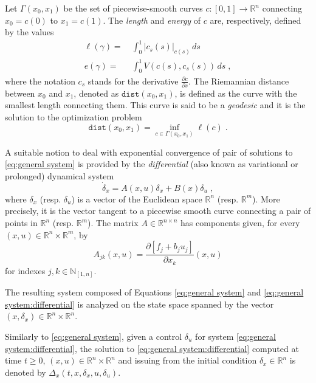 \documentclass[10pt,twocolumn,twoside]{IEEEtran}
\theoremstyle{plain}
\theoremstyle{definition}
\theoremstyle{remark}
\begin{document}
Let $\Gamma(x_0,x_1)$ be the set of piecewise-smooth curves $c:[0,1]\to\mathbb{R}^n$ connecting $x_0=c(0)$ to $x_1=c(1)$. The \emph{length} and \emph{energy} of $c$ are, respectively, defined by the values
\begin{align*}
	\ell(\gamma)=&\ \int_0^1\left|c_s(s)\right|_{c(s)}\,ds\\
	e(\gamma)=&\ \int_0^1V\left(c(s),c_s(s)\right)\,ds\;,
\end{align*}
where the notation $c_s$ stands for the derivative $\tfrac{\partial c}{\partial s}$. The Riemannian distance between $x_0$ and $x_1$, denoted as $\mathbin{\mathtt{dist}}(x_0,x_1)$, is defined as the curve with the smallest length connecting them. This curve is said to be a \emph{geodesic} and it is the solution to the optimization problem
\begin{equation}\label{eq:geodesic formulation}
	\mathbin{\mathtt{dist}}(x_0,x_1)=\inf_{c\in\Gamma(x_0,x_1)}\ell(c)\;.
\end{equation}

A suitable notion to deal with exponential convergence of pair of solutions to \eqref{eq:general system} is provided by the \emph{differential} (also known as variational or prolonged) dynamical system
\begin{equation}\label{eq:general system:differential}
	\dot{\delta}_x=A(x,u)\delta_x+B(x)\delta_u\;,
\end{equation}
where $\delta_x$ (resp. $\delta_u$) is a vector of the Euclidean space $\mathbb{R}^n$ (resp. $\mathbb{R}^m$). More precisely, it is the vector tangent to a piecewise smooth curve connecting a pair of points in $\mathbb{R}^n$ (resp. $\mathbb{R}^m$). The matrix $A\in\mathbb{R}^{n\times n}$ has components given, for every $(x,u)\in\mathbb{R}^n\times\mathbb{R}^m$, by 
\begin{equation*}
	A_{jk}(x,u)=\dfrac{\partial[f_j+b_ju_j]}{\partial x_k}(x,u)	
\end{equation*}
for indexes $j,k\in\mathbb{N}_{[1,n]}$. 

The resulting system composed of Equations \eqref{eq:general system} and \eqref{eq:general system:differential} is analyzed on the state space spanned by the vector $(x,\delta_x)\in\mathbb{R}^n\times\mathbb{R}^n$. 

Similarly to \eqref{eq:general system}, given a control $\delta_u$ for system \eqref{eq:general system:differential}, the solution to \eqref{eq:general system:differential} computed at time $t\geq0$, $(x,u)\in\mathbb{R}^n\times\mathbb{R}^n$ and issuing from the  initial condition $\delta_x\in\mathbb{R}^n$ is denoted by $\Delta_x(t,x,\delta_x,u,\delta_u)$. 
\end{document}
